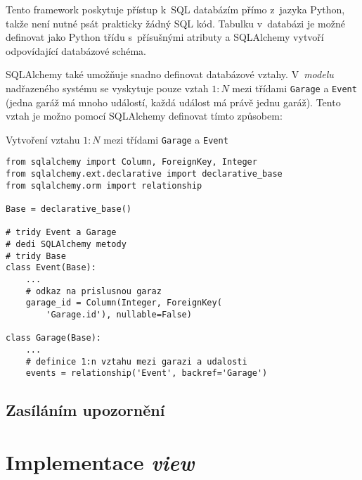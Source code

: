 Tento framework poskytuje přístup k~SQL databázím přímo z~jazyka Python, takže není nutné psát prakticky žádný SQL kód. Tabulku v~databázi je možné definovat jako Python třídu s~přísušnými atributy a SQLAlchemy vytvoří odpovídající databázové schéma. 

SQLAlchemy také umožňuje snadno definovat databázové vztahy. V~\textit{modelu} nadřazeného systému se vyskytuje pouze vztah $1:N$ mezi třídami \texttt{Garage} a \texttt{Event} (jedna garáž má mnoho událostí, každá událost má právě jednu garáž). Tento vztah je možno pomocí SQLAlchemy definovat tímto způsobem:

\begin{listing}[htbp]
\caption{\label{lst:db_relationship} Vytvoření vztahu $1:N$ mezi třídami \texttt{Garage} a \texttt{Event}}
\begin{verbatim}
from sqlalchemy import Column, ForeignKey, Integer
from sqlalchemy.ext.declarative import declarative_base
from sqlalchemy.orm import relationship

Base = declarative_base()

# tridy Event a Garage
# dedi SQLAlchemy metody
# tridy Base
class Event(Base):
    ...
    # odkaz na prislusnou garaz
    garage_id = Column(Integer, ForeignKey(
        'Garage.id'), nullable=False)

class Garage(Base): 
    ...
    # definice 1:n vztahu mezi garazi a udalosti
    events = relationship('Event', backref='Garage')
\end{verbatim}
\end{listing}





\subsection{Zasíláním upozornění}



\section{Implementace \textit{view}}



